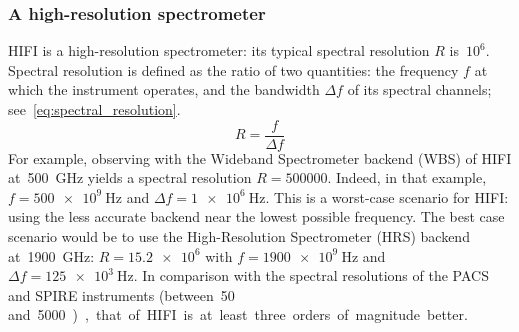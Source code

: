
\subsubsection{A high-resolution spectrometer}

HIFI is a high-resolution spectrometer: its typical spectral resolution $R$ is~$10^6$.
Spectral resolution is defined as the ratio of two quantities: the frequency $f$ at which the instrument operates, and the bandwidth $\Delta f$ of its spectral channels; see~\cref{eq:spectral_resolution}.
\begin{equation}
    R = \frac{f}{\Delta f} \label{eq:spectral_resolution}
\end{equation}
For example, observing with the Wideband Spectrometer backend (WBS) of HIFI at~\SI{500}{\giga\hertz} yields a spectral resolution $R=\num{500000}$.
Indeed, in that example, $f=\SI{500e9}{\hertz}$ and $\Delta f=\SI{1e6}{\hertz}$.
This is a worst-case scenario for HIFI: using the less accurate backend near the lowest possible frequency.
The best case scenario would be to use the High-Resolution Spectrometer (HRS) backend at~\SI{1900}{\giga\hertz}:
$R=\num{15.2e6}$
with $f=\SI{1900e9}{\hertz}$
and $\Delta f=\SI{125e3}{\hertz}$.
In comparison with the spectral resolutions of the PACS and SPIRE instruments (between~\num{50} and~\SI{5000}), that of HIFI is at least three orders of magnitude better.

